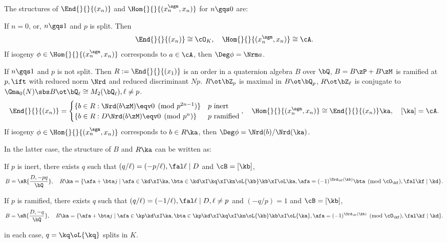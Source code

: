 \documentclass[a4paper, twoside]{article}
\begin{document}
\begin{thm}\label{thm:structure}
	The structures of $\End{}{}{(x_{n})}$ and $\Hom{}{}{(x_{n}^{\sgm},x_{n})}$ for $n\gqs0$ are:
	\begin{itm}
		\item If $n=0$, or, $n\gqs1$ and $p$ is split. Then
		\[
			\End{}{}{(x_{n})}\cong\cO_{K},\quad \Hom{}{}{(x_{n}^{\sgm},x_{n})}\cong\cA.
		\]
		If isogeny $\phi\in\Hom{}{}{(x_{n}^{\sgm},x_{n})}$ corresponds to $a\in\cA$, then $\Deg\phi=\Nrm a$.
		\item If $n\gqs1$ and $p$ is not split. Then $R:=\End{}{}{(x_{1})}$ is an order in a quaternion algebra $B$ over $\bQ$, $B=B\zP+B\zM$ is ramified at $p,\ift$ with reduced norm $\Nrd$ and reduced discriminant $Np$. $R\ot\bZ_{p}$ is maximal in $B\ot\bQ_{p}$, $R\ot\bZ_{\ell}$ is conjugate to $\Gma_{0}(N)\sbs B\ot\bQ_{\ell}\cong M_{2}(\bQ_{\ell}),\ell\neq p$.
		\[
			\End{}{}{(x_{n})}=\begin{cases}
						\{b\in R:\Nrd(b\zM)\eqv0\pmod{p^{2n-1}}\} & \text{$p$ inert} \\
						\{b\in R:D\Nrd(b\zM)\eqv0\pmod{p^{n}}\} & \text{$p$ ramified} \\
						\end{cases},\quad \Hom{}{}{(x_{n}^{\sgm},x_{n})}\cong\End{}{}{(x_{n})}\ka,\quad [\ka]=\cA.
		\]
		If isogeny $\phi\in\Hom{}{}{(x_{n}^{\sgm},x_{n})}$ corresponds to $b\in R\ka$, then $\Deg\phi=\Nrd(b)/\Nrd(\ka)$.
	\end{itm}

	In the latter case, the structure of $B$ and $R\ka$ can be written as:
	\begin{itm}
		\item If $p$ is inert, there exists $q$ such that $(q/\ell)=(-p/\ell), \fal\ell \mid D$ and $\cB=[\kb]$,
		\[
			B=\sR{\frac{D,-pq}{\bQ}},\quad R\ka=\{\afa+\bta j\mid \afa\in\kd\xI\ka, \bta\in\kd\xI\kq\xI\kn\oL{\kb}\kb\xI\oL\ka, \afa=(-1)^{\Ord_{\kf}(\kb)}\bta\pmod{\cO_{\kf}},\fal\kf\mid \kd\}.
		\]
		\item If $p$ is ramified, there exists $q$ such that $(q/\ell)=(-1/\ell), \fal \ell\mid D,\ell\neq p$ and $(-q/p)=1$ and $\cB=[\kb]$,
		\[
			B=\sR{\frac{D,-q}{\bQ}},\quad R\ka=\{\afa+\bta j\mid \afa\in\kp\kd\xI\ka, \bta\in\kp\kd\xI\kq\xI\kn\oL{\kb}\kb\xI\oL{\ka}, \afa=(-1)^{\Ord_{\kf}(\kb)}\pmod{\cO_{\kf}},\fal\kf\mid \kd\}.
		\]
	\end{itm}
	in each case, $q=\kq\oL{\kq}$ splits in $K$.
\end{thm}
\end{document}
